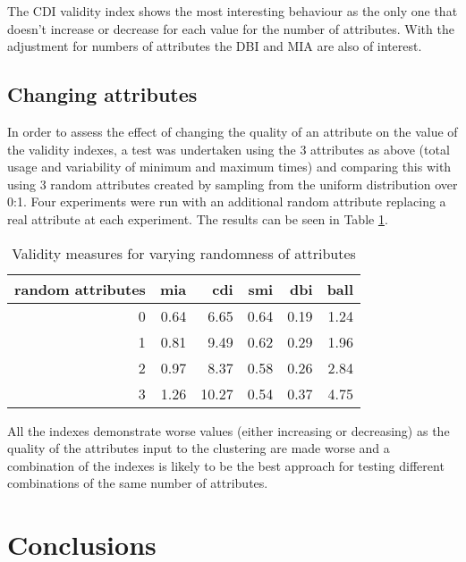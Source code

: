 \documentclass[conference]{IEEEtran}
\begin{document}
The CDI validity index shows the most interesting behaviour as the only one that doesn't increase or decrease for each value for the number of attributes. With the adjustment for numbers of attributes the DBI and MIA are also of interest.

\subsection{Changing attributes}
In order to assess the effect of changing the quality of an attribute on the value of the validity indexes, a test was undertaken using the 3 attributes as above (total usage and variability of minimum and maximum times) and comparing this with using 3 random attributes created by sampling from the uniform distribution over 0:1. Four experiments were run with an additional random attribute replacing a real attribute at each experiment. The results can be seen in Table \ref{table-measures-random}.

\begin{table}[ht]
\begin{center}
\caption{Validity measures for varying randomness of attributes}
\label{table-measures-random} 
\begin{tabular}{rrrrrr}
  \hline
 random attributes & mia & cdi & smi & dbi & ball \\ 
  \hline
0 & 0.64 & 6.65 & 0.64 & 0.19 & 1.24 \\ 
1 & 0.81 & 9.49 & 0.62 & 0.29 & 1.96 \\ 
2 & 0.97 & 8.37 & 0.58 & 0.26 & 2.84 \\ 
3 & 1.26 & 10.27 & 0.54 & 0.37 & 4.75 \\ 
   \hline
\end{tabular}
\end{center}
\end{table}

All the indexes demonstrate worse values (either increasing or decreasing) as the quality of the attributes input to the clustering are made worse and a combination of the indexes is likely to be the best approach for testing different combinations of the same number of attributes.















\section{Conclusions}
\end{document}
